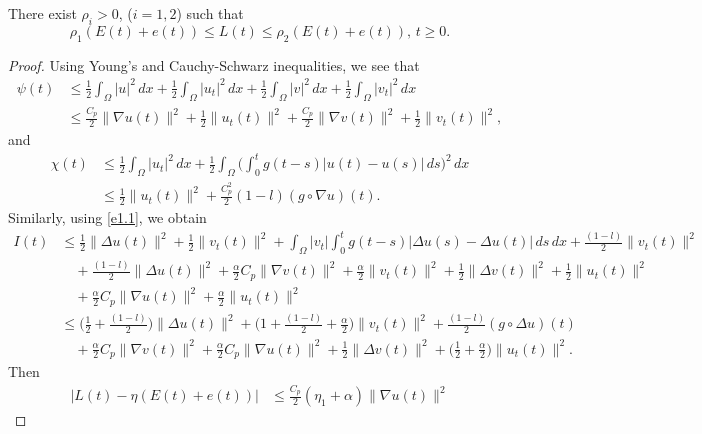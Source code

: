 \documentclass[reqno]{amsart}
\begin{document}
\begin{proposition} \label{prop11}
There exist \(\rho_i> 0 \), (\( i = 1, 2 \)) such that
\begin{equation}
\rho_1 (E(t)+e(t)) \leq L(t) \leq \rho_2 (E(t)+e(t)),\, t\geq 0. \label{e4.21}
\end{equation}
\end{proposition}

\begin{proof}
Using Young's and Cauchy-Schwarz inequalities, we see that
\begin{align*}
\psi(t)
& \leq \frac{1}{2}\int_{\Omega} |u|^2 \, dx+ \frac{1}{2}\int_{\Omega}|u_t|^2 \, dx
+\frac{1}{2}\int_{\Omega} |v|^2 \, dx+ \frac{1}{2}\int_{\Omega}|v_t|^2 \, dx \\
&\leq \frac{C_p}{2} \| \nabla u(t) \|^2+ \frac{1}{2} \| u_t(t) \|^2
 + \frac{C_p}{2} \| \nabla v(t) \|^2+ \frac{1}{2} \| v_t(t) \|^2,
\end{align*}
and
\begin{align*}
 \chi(t)
&\leq \frac{1}{2}\int_{\Omega}|u_t|^2 \, dx
 +\frac{1}{2} \int_{\Omega} \Big( \int_0^{t} g(t - s)|u(t) - u(s)| \, ds \Big)^2 \, dx
 \\
&\leq \frac{1}{2} \| u_t(t) \|^2+\frac{C_p^2 }{2} (1-l) (g \circ \nabla u)(t).
\end{align*}
Similarly, using \eqref{e1.1}, we obtain
\begin{align*}
I(t)
& \leq \frac{1}{2} \| \Delta u(t) \|^2+\frac{1}{2}\| v_t (t)\|^2
 +\int_{\Omega} | v_t| \int_0^t g(t-s) |\Delta u(s)- \Delta u(t)|\, ds\, dx
 +\frac{(1-l)}{2} \| v_t(t) \|^2\\
&\quad +\frac{(1-l)}{2} \| \Delta u (t)\|^2
 +\frac{\alpha}{2}C_p \| \nabla v(t) \|^2+\frac{\alpha}{2}\| v_t(t) \|^2
  +\frac{1}{2}\| \Delta v(t) \|^2+\frac{1}{2}\| u_t(t) \|^2\\
&\quad  +\frac{\alpha}{2}C_p \| \nabla u(t) \|^2+\frac{\alpha}{2} \| u_t(t) \|^2\\
& \leq \Big( \frac{1}{2}+\frac{(1-l)}{2}\Big)
 \| \Delta u(t)\|^2+\Big(1+\frac{(1-l)}{2}+\frac{\alpha}{2}\Big)
  \| v_t(t) \|^2 +\frac{(1-l)}{2} (g \circ \Delta u)(t)\\
&\quad + \frac{\alpha}{2}C_p \| \nabla v (t)\|^2
 +\frac{\alpha}{2}C_p \| \nabla u (t)\|^2+\frac{1}{2}\| \Delta v(t) \|^2
 +\Big( \frac{1}{2}+\frac{\alpha}{2} \Big) \| u_t (t)\|^2.
\end{align*}
Then
\begin{align*}
|L(t) - \eta (E(t)+ e(t))|
& \leq \frac{C_p }{2}( \eta_1 +\alpha )\| \nabla u(t) \|^2

\end{align*}
\end{proof}
\end{document}

